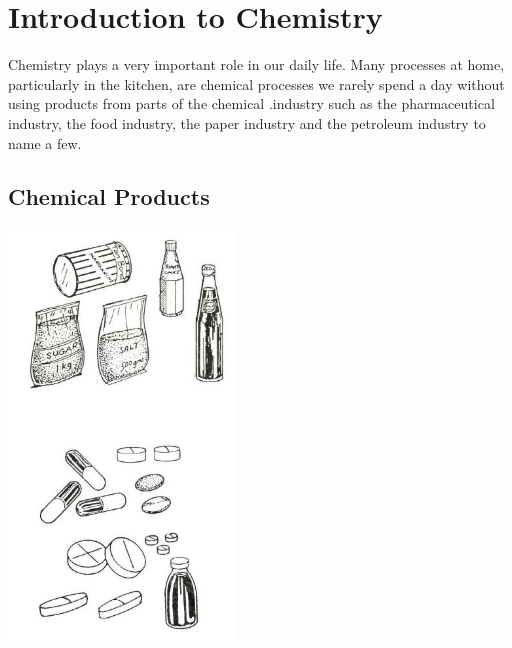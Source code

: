 \section{Introduction to Chemistry} 

\begin{multicols}{2}



Chemistry plays a very important role in our
daily life. Many processes at home, particularly
in the kitchen, are chemical processes we rarely
spend a day without using products from parts
of the chemical .industry such as the
pharmaceutical industry, the food industry, the
paper industry and the petroleum industry to
name a few.


\subsection{Chemical Products}

\begin{center}
\includegraphics[width=0.45\textwidth]{./img/source/chemical-products.jpg}
\end{center}


\end{multicols}
